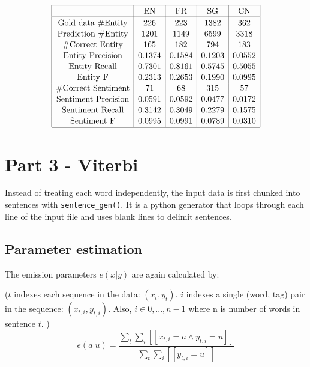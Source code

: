 \documentclass[12pt]{article}
\begin{document}
\[
\begin{array}{|c|c|c|c|c|}
\hline \rule{0pt}{1em}
& \mbox{EN} & \mbox{FR} & \mbox{SG} & \mbox{CN} \\
\hline \rule{0pt}{1em}
\mbox{Gold data \#Entity} & 226    & 223    & 1382   & 362    \\[0.1em]
\mbox{Prediction \#Entity}& 1201   & 1149   & 6599   & 3318   \\[0.1em]
\mbox{\#Correct Entity}   & 165    & 182    & 794    & 183    \\[0.1em]
\mbox{Entity Precision}   & 0.1374 & 0.1584 & 0.1203 & 0.0552 \\[0.1em]
\mbox{Entity Recall}      & 0.7301 & 0.8161 & 0.5745 & 0.5055 \\[0.1em]
\mbox{Entity F}           & 0.2313 & 0.2653 & 0.1990 & 0.0995 \\[0.1em]
\mbox{\#Correct Sentiment}& 71     & 68     & 315    & 57     \\[0.1em]
\mbox{Sentiment Precision}& 0.0591 & 0.0592 & 0.0477 & 0.0172 \\[0.1em]
\mbox{Sentiment Recall}   & 0.3142 & 0.3049 & 0.2279 & 0.1575 \\[0.1em]
\mbox{Sentiment F}        & 0.0995 & 0.0991 & 0.0789 & 0.0310 \\[0.1em] 
\hline
\end{array}
\]



\pagebreak

\section{Part 3 - Viterbi}

Instead of treating each word independently, the input data is first chunked into sentences with \verb|sentence_gen()|. It is a python generator that loops through each line of the input file and uses blank lines to delimit sentences.

\subsection{Parameter estimation}

The emission parameters \(e(x|y)\) are again calculated by:

(\(t\) indexes each sequence in the data: \((x_t, y_t)\). \(i\) indexes a single (word, tag) pair in the sequence: \((x_{t,i}, y_{t,i})\). Also, \(i \in {0,...,n-1}\) where n is number of words in sentence \(t\). )
\[ e(a|u) = \frac{\sum_t \sum_i [[x_{t,i}=a \land y_{t,i}=u]] }{\sum_{t} \sum_i [[y_{t,i}=u]] } \]
\end{document}
